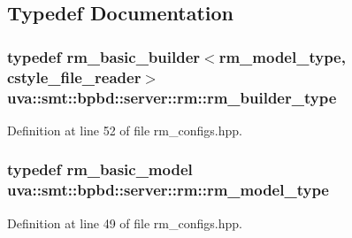 \subsection{Typedef Documentation}
\hypertarget{namespaceuva_1_1smt_1_1bpbd_1_1server_1_1rm_aaf06b65ebdbd4a141657ce0f28998e17}{}
\subsubsection[{rm\+\_\+builder\+\_\+type}]{\setlength{\rightskip}{0pt plus 5cm}typedef {\bf rm\+\_\+basic\+\_\+builder}$<${\bf rm\+\_\+model\+\_\+type}, {\bf cstyle\+\_\+file\+\_\+reader}$>$ {\bf uva\+::smt\+::bpbd\+::server\+::rm\+::rm\+\_\+builder\+\_\+type}}\label{namespaceuva_1_1smt_1_1bpbd_1_1server_1_1rm_aaf06b65ebdbd4a141657ce0f28998e17}


Definition at line 52 of file rm\+\_\+configs.\+hpp.

\hypertarget{namespaceuva_1_1smt_1_1bpbd_1_1server_1_1rm_a4d0c6c248c7451ba74697118cc6efa00}{}
\subsubsection[{rm\+\_\+model\+\_\+type}]{\setlength{\rightskip}{0pt plus 5cm}typedef {\bf rm\+\_\+basic\+\_\+model} {\bf uva\+::smt\+::bpbd\+::server\+::rm\+::rm\+\_\+model\+\_\+type}}\label{namespaceuva_1_1smt_1_1bpbd_1_1server_1_1rm_a4d0c6c248c7451ba74697118cc6efa00}


Definition at line 49 of file rm\+\_\+configs.\+hpp.


